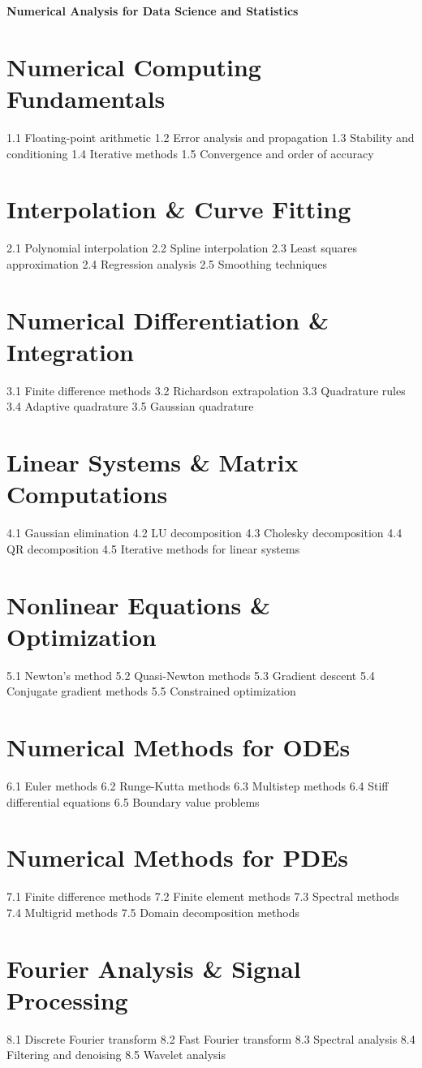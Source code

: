 {\LARGE \bf{Numerical Analysis for Data Science and Statistics}}
\section{Numerical Computing Fundamentals}
1.1 Floating-point arithmetic
1.2 Error analysis and propagation
1.3 Stability and conditioning
1.4 Iterative methods
1.5 Convergence and order of accuracy
\section{Interpolation \& Curve Fitting}
2.1 Polynomial interpolation
2.2 Spline interpolation
2.3 Least squares approximation
2.4 Regression analysis
2.5 Smoothing techniques
\section{Numerical Differentiation \& Integration}
3.1 Finite difference methods
3.2 Richardson extrapolation
3.3 Quadrature rules
3.4 Adaptive quadrature
3.5 Gaussian quadrature
\section{Linear Systems \& Matrix Computations}
4.1 Gaussian elimination
4.2 LU decomposition
4.3 Cholesky decomposition
4.4 QR decomposition
4.5 Iterative methods for linear systems
\section{Nonlinear Equations \& Optimization}
5.1 Newton's method
5.2 Quasi-Newton methods
5.3 Gradient descent
5.4 Conjugate gradient methods
5.5 Constrained optimization
\section{Numerical Methods for ODEs}
6.1 Euler methods
6.2 Runge-Kutta methods
6.3 Multistep methods
6.4 Stiff differential equations
6.5 Boundary value problems
\section{Numerical Methods for PDEs}
7.1 Finite difference methods
7.2 Finite element methods
7.3 Spectral methods
7.4 Multigrid methods
7.5 Domain decomposition methods
\section{Fourier Analysis \& Signal Processing}
8.1 Discrete Fourier transform
8.2 Fast Fourier transform
8.3 Spectral analysis
8.4 Filtering and denoising
8.5 Wavelet analysis
